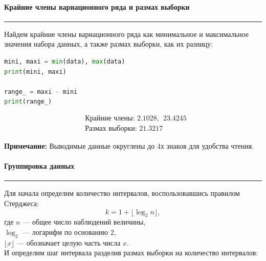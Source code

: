 \documentclass[a4paper, 14pt]{extarticle}
\begin{document}
\paragraph{Крайние члены вариационного ряда и размах выборки}\vspace{-20pt}\rule{\linewidth}{0.1mm}

Найдем крайние члены вариационного ряда как минимальное и максимальное значения 
набора данных, а также размах выборки, как их разницу:

\vspace{10pt}

\begin{center}
  \begin{lstlisting}[language=Python]
mini, maxi = min(data), max(data)
print(mini, maxi)

range_ = maxi - mini
print(range_)
  \end{lstlisting}
\end{center}

\vspace{-5pt}

\begin{align*}
  & \text{Крайние члены: }  2.1028, \hspace{5pt} 23.4245 \\
  & \text{Размах выборки: }  21.3217
\end{align*}

{\footnotesize \textbf{Примечание:} Выводимые данные округлены до 4х знаков для удобства чтения.}

\newpage

\paragraph{Группировка данных}\vspace{-20pt}\rule{\linewidth}{0.1mm}

Для начала определим количество интервалов, воспользовавшись правилом
Стерджеса:
\begin{equation*}
    k = 1 + \lfloor \log_2 n \rfloor,
\end{equation*}
где $n$ — общее число наблюдений величины, \\ 
$\log_2$ — логарифм по основанию 2, \\
$\lfloor x \rfloor$ — обозначает целую часть числа $x$. \\

И определим шаг интервала разделив размах выборки на количество интервалов:
\end{document}
